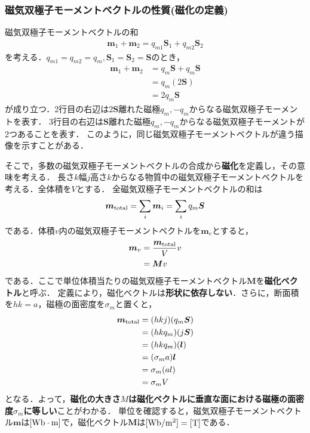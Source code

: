 \documentclass{report}
\begin{document}
  \subsubsection{磁気双極子モーメントベクトルの性質(磁化の定義)}
  磁気双極子モーメントベクトルの和
  \begin{align}
    \bm{m}_1 + \bm{m}_2 = q_{m1}\bm{S}_1 + q_{m2}\bm{S}_2
  \end{align}
  を考える．$q_{m1} = q_{m2} = q_m,\bm{S}_1 = \bm{S}_2 = \bm{S}$のとき，
  \begin{align}
    \bm{m}_1 + \bm{m}_2 &= q_m\bm{S} + q_m\bm{S}\\
    &= q_m(2\bm{S})\\
    &= 2q_m\bm{S}
  \end{align}
  が成り立つ．2行目の右辺は$2\bm{S}$離れた磁極$q_m,-q_m$からなる磁気双極子モーメントを表す．
  3行目の右辺は$\bm{S}$離れた磁極$q_m,-q_m$からなる磁気双極子モーメントが2つあることを表す．
  このように，同じ磁気双極子モーメントベクトルが違う描像を示すことがある．

  そこで，多数の磁気双極子モーメントベクトルの合成から\textbf{磁化}を定義し，その意味を考える．
  長さ$k$幅$j$高さ$k$からなる物質中の磁気双極子モーメントベクトルを考える．全体積を$V$とする．
  全磁気双極子モーメントベクトルの和は
  \begin{align}
    \bm{m}_{\mathrm{total}} = \sum_{i} \bm{m}_i = \sum_{i} q_m \bm{S}
  \end{align}
  である．体積$v$内の磁気双極子モーメントベクトルを$\bm{m}_v$とすると，
  \begin{align}
    \bm{m}_v &= \frac{\bm{m}_{\mathrm{total}}}{V}v\\
    &=\bm{M}v
  \end{align}
  である．ここで単位体積当たりの磁気双極子モーメントベクトル$\bm{M}$を\textbf{磁化ベクトル}と呼ぶ．
  定義により，磁化ベクトルは\textbf{形状に依存しない}．さらに，断面積を$hk=a$，磁極の面密度を$\sigma_m$と置くと，
  \begin{align}
    \bm{m}_{\mathrm{total}} &= (hkj)(q_m\bm{S})\\
    &= (hkq_m)(j\bm{S})\\
    &= (hkq_m)(\bm{l})\\
    &= (\sigma_m a)\bm{l}\\
    &= \sigma_m(al)\\
    &= \sigma_m V
  \end{align}
  となる．よって，\textbf{磁化の大きさ$M$は磁化ベクトルに垂直な面における磁極の面密度$\sigma_m$に等しい}ことがわかる．
  単位を確認すると，磁気双極子モーメントベクトル$\bm{m}$は$[\mathrm{Wb\cdot m}]$で，磁化ベクトル$\bm{M}$は$[\mathrm{Wb/m^2}]=[\mathrm{T}]$である．
\end{document}
